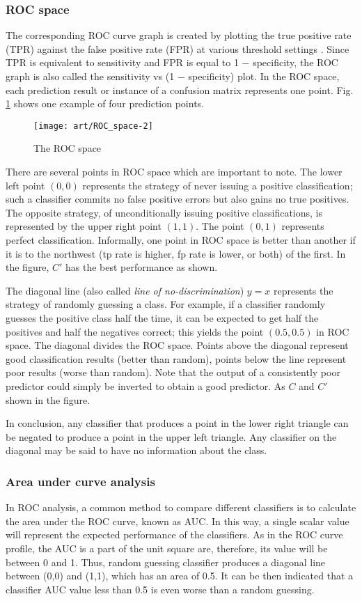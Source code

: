 \subsubsection{ROC space}
The corresponding ROC curve graph is created by plotting the true positive rate (TPR) against the false positive rate (FPR) at various threshold settings \citep{Fawcett2006}.  Since TPR is equivalent to sensitivity and FPR is equal to 1 − specificity, the ROC graph is also called the sensitivity vs (1 − specificity) plot. In the ROC space, each prediction result or instance of a confusion matrix represents one point. Fig. \ref{ROC_space} shows one example of four prediction points.
\begin{figure}[ht]
	\centering
	\texttt{[image: art/ROC\_space-2]}
	\caption{The ROC space}
	\label{ROC_space}
\end{figure}
There are several points in ROC space which are important to note. The lower left point $ (0,0) $ represents the strategy of never issuing a positive classification; such a classifier commits no false positive errors but also gains no true positives. The opposite strategy, of unconditionally issuing positive classifications, is represented by the upper right point $ (1,1) $. The point $ (0,1) $ represents perfect classification.  Informally, one point in ROC space is better than another if it is to the northwest (tp rate is higher, fp rate is lower, or both) of the first. In the figure, $C'$ has the best performance as shown.

The diagonal line (also called \textit{line of no-discrimination}) $y = x$ represents the strategy of randomly guessing a class. For example, if a classifier randomly guesses the positive class half the time, it can be expected to get half the positives and half the negatives correct; this yields the point $ (0.5, 0.5) $ in ROC space. The diagonal divides the ROC space. Points above the diagonal represent good classification results (better than random), points below the line represent poor results (worse than random). Note that the output of a consistently poor predictor could simply be inverted to obtain a good predictor. As $C$ and $C'$ shown in the figure.

In conclusion,  any classifier that produces a point in the lower right triangle can be negated to produce a point in the upper left triangle. Any classifier on the diagonal may be said to have no information about the class.

\subsubsection{Area under curve analysis}
In ROC analysis, a common method to compare different classifiers is to calculate the area under the ROC curve, known as AUC\citep{Fawcett2006}. In this way, a single scalar value will represent the expected performance of the classifiers. As in the ROC curve profile, the AUC is a part of the unit square are, therefore, its value will be between 0 and 1. Thus, random guessing classifier produces a diagonal line between (0,0) and (1,1), which has an area of 0.5. It can be then indicated that a classifier AUC value less than 0.5 is even worse than a random guessing. 

